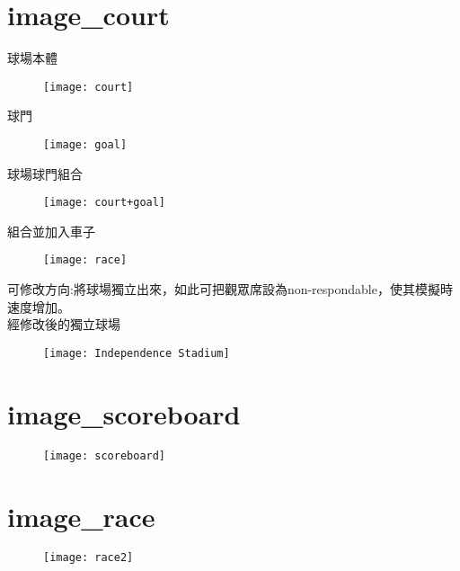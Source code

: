 \section{image\_court}
{\begin{textblock}球場本體\\
\begin{figure}
\texttt{[image: court]}
\end{figure}
\end{textblock}}
{\begin{textblock}球門\\
\begin{figure}
\texttt{[image: goal]}
\end{figure}
\end{textblock}}
{\begin{textblock}球場球門組合\\
\begin{figure}
\texttt{[image: court+goal]}
\end{figure}
\end{textblock}}
{\begin{textblock}組合並加入車子\\
\begin{figure}
\texttt{[image: race]}
\end{figure}
\end{textblock}}
{\begin{textblock}可修改方向:將球場獨立出來，如此可把觀眾席設為non-respondable，使其模擬時速度增加。\\
經修改後的獨立球場\\
\begin{figure}
\texttt{[image: Independence Stadium]}
\end{figure}
\end{textblock}}
\section{image\_scoreboard}
\begin{figure}
\texttt{[image: scoreboard]}
\end{figure}
\section{image\_race}
\begin{figure}
\texttt{[image: race2]}
\end{figure}


